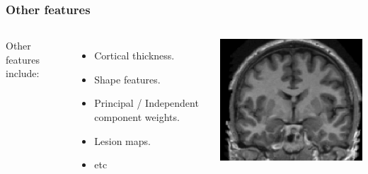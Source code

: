 \begin{frame}
\frametitle{Other features}
\begin{columns}[c]
Other features include:
\begin{itemize}
\item Cortical thickness.
\item Shape features.
\item Principal / Independent component weights.
\item Lesion maps.
\item etc
\end{itemize}
\includegraphics[width=\textwidth]{brain-raw}
\end{columns}
\end{frame}

